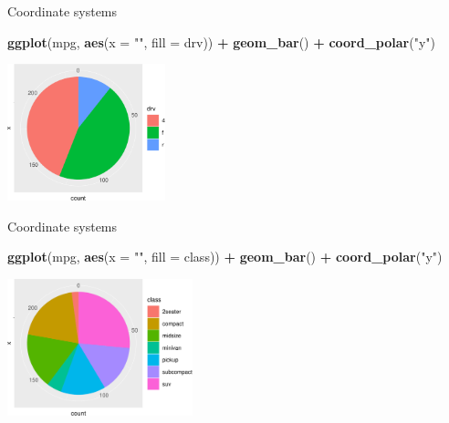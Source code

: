 \documentclass[ignorenonframetext,]{beamer}
\newenvironment{Shaded}{\begin{snugshade}}{\end{snugshade}}
\newcommand{\DataTypeTok}[1]{\textcolor[rgb]{0.13,0.29,0.53}{#1}}
\newcommand{\KeywordTok}[1]{\textcolor[rgb]{0.13,0.29,0.53}{\textbf{#1}}}
\newcommand{\NormalTok}[1]{#1}
\newcommand{\OperatorTok}[1]{\textcolor[rgb]{0.81,0.36,0.00}{\textbf{#1}}}
\newcommand{\StringTok}[1]{\textcolor[rgb]{0.31,0.60,0.02}{#1}}
\begin{document}
\begin{frame}[fragile]{Coordinate systems}
\protect\hypertarget{coordinate-systems-2}{}

\begin{Shaded}
\begin{Highlighting}[]
\KeywordTok{ggplot}\NormalTok{(mpg, }\KeywordTok{aes}\NormalTok{(}\DataTypeTok{x =} \StringTok{""}\NormalTok{, }\DataTypeTok{fill =}\NormalTok{ drv)) }\OperatorTok{+}
\StringTok{  }\KeywordTok{geom_bar}\NormalTok{() }\OperatorTok{+}
\StringTok{  }\KeywordTok{coord_polar}\NormalTok{(}\StringTok{"y"}\NormalTok{)}
\end{Highlighting}
\end{Shaded}

\begin{center}\includegraphics[height=150px]{data-visualization_files/figure-beamer/unnamed-chunk-143-1} \end{center}

\end{frame}

\begin{frame}[fragile]{Coordinate systems}
\protect\hypertarget{coordinate-systems-3}{}

\begin{Shaded}
\begin{Highlighting}[]
\KeywordTok{ggplot}\NormalTok{(mpg, }\KeywordTok{aes}\NormalTok{(}\DataTypeTok{x =} \StringTok{""}\NormalTok{, }\DataTypeTok{fill =}\NormalTok{ class)) }\OperatorTok{+}
\StringTok{  }\KeywordTok{geom_bar}\NormalTok{() }\OperatorTok{+}
\StringTok{  }\KeywordTok{coord_polar}\NormalTok{(}\StringTok{"y"}\NormalTok{)}
\end{Highlighting}
\end{Shaded}

\begin{center}\includegraphics[height=150px]{data-visualization_files/figure-beamer/unnamed-chunk-144-1} \end{center}

\end{frame}
\end{document}
